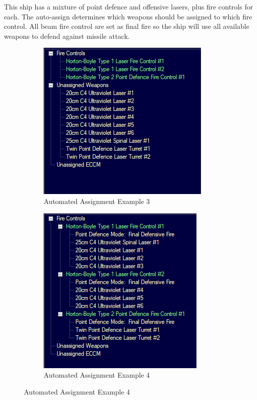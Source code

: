 \documentclass[../Aurora C# unofficial manual.tex]{subfiles}
\begin{document}
	This ship has a mixture of point defence and offensive lasers, plus fire controls for each. The auto-assign determines which weapons should be assigned to which fire control. All beam fire control are set as final fire so the ship will use all available weapons to defend against missile attack.
	\begin{figure}[H]
		\centering
		\begin{subfigure}{.5\textwidth}
			\centering
			\includegraphics[width=0.5\linewidth]{images/AutomatedAssignment3}
			\caption[Automated Assignment]{Automated Assignment Example 3}
			\label{fig:automatedassignment3}
		\end{subfigure}%
		\begin{subfigure}{.5\textwidth}
			\centering
			\includegraphics[width=0.5\linewidth]{images/AutomatedAssignment4}
			\caption[Automated Assignment]{Automated Assignment Example 4}
			\label{fig:automatedassignment4}
		\end{subfigure}
	\end{figure}
\end{document}
